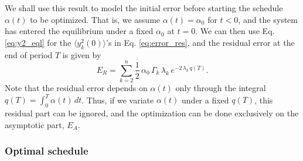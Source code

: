 \documentclass[reprint, floatfix]{revtex4-1}
\newcommand{\Err}{E}
\begin{document}
We shall use this result to model the initial error
before starting the schedule $\alpha(t)$ to be optimized.
%
That is, we assume
$\alpha(t) = \alpha_0$
for $t < 0$, and
the system has entered the equilibrium
under a fixed $\alpha_0$ at $t = 0$.
%
We can then use Eq. \eqref{eq:y2_eql}
for the $\langle y_k^2(0) \rangle$'s
in Eq. \eqref{eq:error_res},
and
the residual error at the end of period $T$
is given by
%
\begin{equation}
  \Err_R
  =
  \sum_{k = 2}^n
      \frac 1 2 \, \alpha_0 \, \Gamma_k \, \lambda_k \,
      e^{  - 2 \, \lambda_k \, q(T) }
  .
  \label{eq:error_res1}
\end{equation}
%
Note that the residual error
depends on $\alpha(t)$ only through
the integral $q(T) = \int_0^T \alpha(t) \, dt$.
%
Thus, if we variate $\alpha(t)$ under a fixed $q(T)$,
this residual part can be ignored,
and the optimization can be done exclusively
on the asymptotic part, $\Err_A$.



\subsubsection{\label{sec:optschedule}
Optimal schedule}
\end{document}
